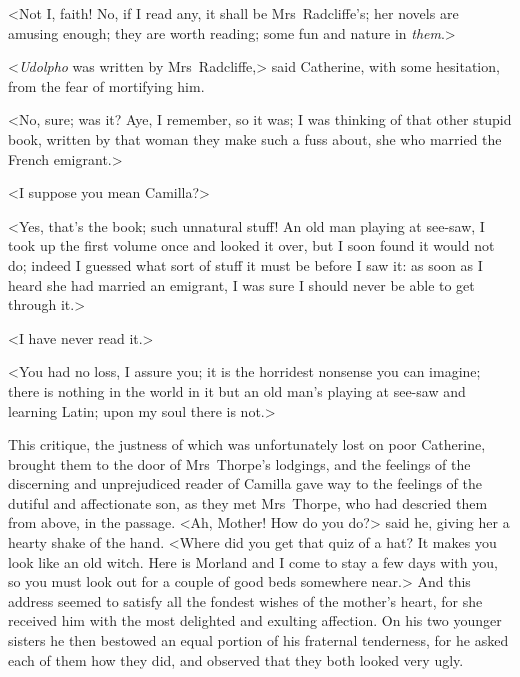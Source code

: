  <Not I, faith! No, if I read any, it shall be Mrs~Radcliffe's; her novels are amusing enough; they are worth reading; some fun and nature in \textit{them}.> 

 <\textit{Udolpho} was written by Mrs~Radcliffe,> said Catherine, with some hesitation, from the fear of mortifying him. 

 <No, sure; was it? Aye, I remember, so it was; I was thinking of that other stupid book, written by that woman they make such a fuss about, she who married the French emigrant.> 

 <I suppose you mean Camilla?> 

 <Yes, that's the book; such unnatural stuff! An old man playing at see-saw, I took up the first volume once and looked it over, but I soon found it would not do; indeed I guessed what sort of stuff it must be before I saw it: as soon as I heard she had married an emigrant, I was sure I should never be able to get through it.> 

 <I have never read it.> 

 <You had no loss, I assure you; it is the horridest nonsense you can imagine; there is nothing in the world in it but an old man's playing at see-saw and learning Latin; upon my soul there is not.> 

 This critique, the justness of which was unfortunately lost on poor Catherine, brought them to the door of Mrs~Thorpe's lodgings, and the feelings of the discerning and unprejudiced reader of Camilla gave way to the feelings of the dutiful and affectionate son, as they met Mrs~Thorpe, who had descried them from above, in the passage. <Ah, Mother! How do you do?> said he, giving her a hearty shake of the hand. <Where did you get that quiz of a hat? It makes you look like an old witch. Here is Morland and I come to stay a few days with you, so you must look out for a couple of good beds somewhere near.> And this address seemed to satisfy all the fondest wishes of the mother's heart, for she received him with the most delighted and exulting affection. On his two younger sisters he then bestowed an equal portion of his fraternal tenderness, for he asked each of them how they did, and observed that they both looked very ugly. 

